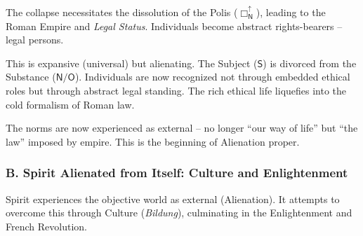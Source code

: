 \documentclass[12pt]{book}
\newcommand{\NBoxUp}{\Box_{\mathsf{N}}^{\uparrow}}
\begin{document}
\begin{enumerate}
The collapse necessitates the dissolution of the Polis ($\NBoxUp$), leading to the Roman Empire and \emph{Legal Status}. Individuals become abstract rights-bearers -- legal persons.

This is expansive (universal) but alienating. The Subject ($\mathsf{S}$) is divorced from the Substance ($\mathsf{N/O}$). Individuals are now recognized not through embedded ethical roles but through abstract legal standing. The rich ethical life liquefies into the cold formalism of Roman law.

The norms are now experienced as external -- no longer ``our way of life'' but ``the law'' imposed by empire. This is the beginning of Alienation proper.
\end{enumerate}

\subsubsection{B. Spirit Alienated from Itself: Culture and Enlightenment}

Spirit experiences the objective world as external (Alienation). It attempts to overcome this through Culture (\emph{Bildung}), culminating in the Enlightenment and French Revolution.
\end{document}

